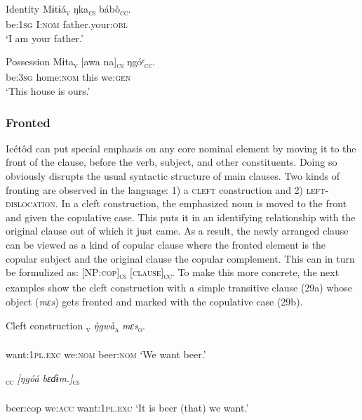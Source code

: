 Identity
\ea\label{ex:}
\gll Mɨtɨá\textsc{\textsubscript{v}}   ŋka\textsc{\textsubscript{cs}}    bábò\textsc{\textsubscript{cc}}.\\
be:\textsc{1sg}   I:\textsc{nom}    father.your:\textsc{obl}\\
\glt ‘I am your father.’ 
\z




Possession
\ea\label{ex:}
\gll Mɨta\textsc{\textsubscript{v}}     [awa     na]\textsc{\textsubscript{cs}}   ŋgóᵉ\textsc{\textsubscript{cc}}.\\
be:\textsc{3sg}   home:\textsc{nom}   this   we:\textsc{gen}\\
\glt ‘This house is ours.’ 
\z




\subsubsection{Fronted}

Icétôd can put special emphasis on any core nominal element by moving it to the front of the clause, before the verb, subject, and other constituents. Doing so obviously disrupts the usual syntactic structure of main clauses. Two kinds of fronting are observed in the language: 1) a \textsc{cleft} construction and 2) \textsc{left-dislocation}. In a cleft construction, the emphasized noun is moved to the front and given the copulative case. This puts it in an identifying relationship with the original clause out of which it just came. As a result, the newly arranged clause can be viewed as a kind of copular clause where the fronted element is the copular subject and the original clause the copular complement. This can in turn be formulized as: [NP:\textsc{cop}]\textsc{\textsubscript{cs}}\textsc{ [clause]}\textsc{\textsubscript{cc}}. To make this more concrete, the next examples show the cleft construction with a simple transitive clause (29a) whose object (\textit{mɛs}) gets fronted and marked with the copulative case (29b). 




Cleft construction
\ea\label{ex:}
\textsc{\textsubscript{v}}    \textit{\`{ŋ}gwà}\textsc{\textsubscript{a}}\textit{    mɛs}\textsc{\textsubscript{o}}. \\
    \\
want:\textsc{1pl.exc}   we:\textsc{nom}  beer:\textsc{nom}
\glt ‘We want beer.’ 
\z




\ea\label{ex:}
\textsc{\textsubscript{cc}}     \textit{[ŋgóá    bɛɗɨm.]}\textsc{\textsubscript{cs}} \\
    \\
beer:cop    we:\textsc{acc}   want:\textsc{1pl.exc}   
\glt ‘It is beer (that) we want.’ 
\z


